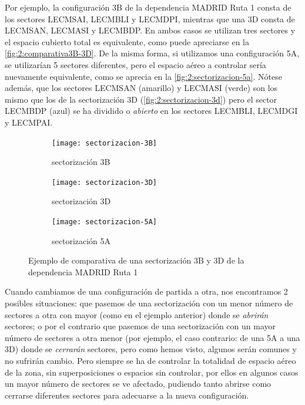 Por ejemplo, la configuración 3B de la dependencia MADRID Ruta 1 consta de los sectores LECMSAI, LECMBLI y LECMDPI, mientras que una 3D consta de LECMSAN, LECMASI y LECMBDP. En ambos casos se utilizan tres sectores y el espacio cubierto total es equivalente, como puede apreciarse en la \autoref{fig:2:comparativa3B-3D}.
De la misma forma, si utilizamos una configuración 5A, se utilizarían 5 sectores diferentes, pero el espacio aéreo a controlar sería nuevamente equivalente, como se aprecia en la \autoref{fig:2:sectorizacion-5a}.
Nótese además, que los sectores LECMSAN (amarillo) y LECMASI (verde) son los mismo que los de la sectorización 3D (\autoref{fig:2:sectorizacion-3d}) pero el sector LECMBDP (azul) se ha dividido o \textit{abierto} en los sectores LECMBLI, LECMDGI y LECMPAI.
\\

\begin{figure}[htbp]
    \centering
    \begin{subfigure}{\linewidth}
        \centering
        \texttt{[image: sectorizacion-3B]}
        \caption{sectorización 3B\linebreak}
    \end{subfigure}

    \begin{subfigure}{\linewidth}
        \centering
        \texttt{[image: sectorizacion-3D]}
        \caption{sectorización 3D\linebreak}
        \label{fig:2:sectorizacion-3d}
    \end{subfigure}

    \begin{subfigure}{\linewidth}
        \centering
        \texttt{[image: sectorizacion-5A]}
        \caption{sectorización 5A}
        \label{fig:2:sectorizacion-5a}
    \end{subfigure}

    \caption[Ejemplo de sectorización 3B y 3D de la dependencia MADRID Ruta 1]{Ejemplo de comparativa de una 
    sectorización 3B y 3D 
    de la dependencia MADRID Ruta 1}
    \label{fig:2:comparativa3B-3D}
\end{figure}


Cuando cambiamos de una configuración de partida a otra, nos encontramos 2 posibles situaciones: que pasemos de una sectorización con un menor número de sectores a otra con mayor (como en el ejemplo anterior) donde se \textit{abrirán} sectores; o por el contrario que pasemos de una sectorización con un mayor número de sectores a otra menor (por ejemplo, el caso contrario: de una 5A a una 3D) donde se \textit{cerrarán} sectores, pero como hemos visto, algunos serán comunes y no sufrirán cambio. 
Pero siempre se ha de controlar la totalidad de espacio aéreo de la zona, sin superposiciones o espacios sin controlar, por ellos en algunos casos un mayor número de sectores se ve afectado, pudiendo tanto abrirse como cerrarse diferentes sectores para adecuarse a la nueva configuración.
\\

